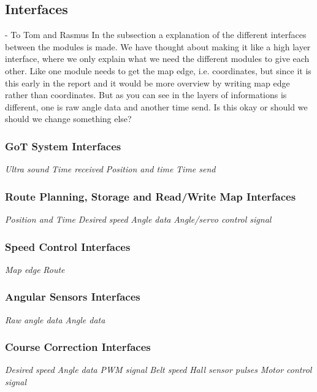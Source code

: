 \subsection{Interfaces}
- To Tom and Rasmus \newline
In the subsection a explanation of the different interfaces between the modules is made. We have thought about making it like a high layer interface, where we only explain what we need the different modules to give each other. Like one module needs to get the map edge, i.e. coordinates, but since it is this early in the report and it would be more overview by writing map edge rather than coordinates. But as you can see in  the layers of informations is different, one is raw angle data and another time send. Is this okay or should we should we change something else?
\indent

\subsubsection{GoT System Interfaces}
\textit{Ultra sound} \textit{Time received} \textit{Position and time} \textit{Time send}

\subsubsection{Route Planning, Storage and Read/Write Map Interfaces}
\textit{Position and Time} \textit{Desired speed} \textit{Angle data} \textit{Angle/servo control signal}

\subsubsection{Speed Control Interfaces}
\textit{Map edge} \textit{Route}

\subsubsection{Angular Sensors Interfaces}
\textit{Raw angle data} \textit{Angle data}

\subsubsection{Course Correction Interfaces}
\textit{Desired speed} \textit{Angle data} \textit{PWM signal} \textit{Belt speed} \textit{Hall sensor pulses} \textit{Motor control signal}

